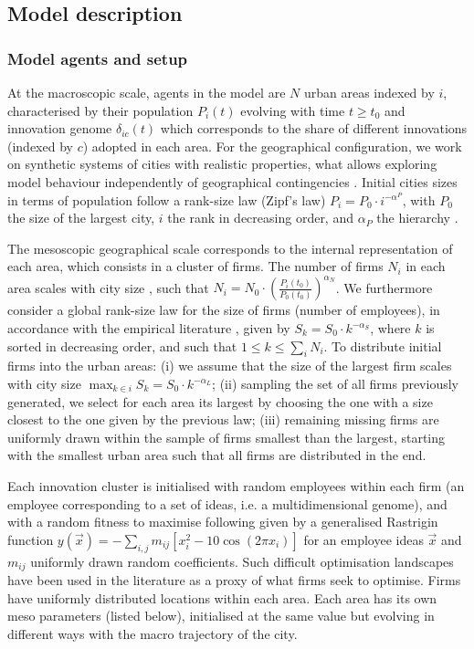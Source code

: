 \documentclass[letterpaper]{article}
\begin{document}
\subsection{Model description}

\subsubsection{Model agents and setup}

At the macroscopic scale, agents in the model are $N$ urban areas indexed by $i$, characterised by their population $P_i(t)$ evolving with time $t\geq t_0$ and innovation genome $\delta_{ic}(t)$ which corresponds to the share of different innovations (indexed by $c$) adopted in each area. For the geographical configuration, we work on synthetic systems of cities with realistic properties, what allows exploring model behaviour independently of geographical contingencies \citep{raimbault2019space}. Initial cities sizes in terms of population follow a rank-size law (Zipf's law) $P_i = P_0 \cdot i^{-\alpha^P}$, with $P_0$ the size of the largest city, $i$ the rank in decreasing order, and $\alpha_P$ the hierarchy \citep{ioannides2003zipf}.

The mesoscopic geographical scale corresponds to the internal representation of each area, which consists in a cluster of firms. The number of firms $N_i$ in each area scales with city size \citep{pumain2006evolutionary}, such that $N_i = N_0 \cdot \left(\frac{P_i (t_0)}{P_0 (t_0)}\right)^{\alpha_N}$. We furthermore consider a global rank-size law for the size of firms (number of employees), in accordance with the empirical literature \citep{axtell2001zipf}, given by $S_k = S_0 \cdot k^{- \alpha_S}$, where $k$ is sorted in decreasing order, and such that $1 \leq k \leq \sum_i N_i$. To distribute initial firms into the urban areas: (i) we assume that the size of the largest firm scales with city size $\max_{k\in i} S_k = S_0 \cdot k^{- \alpha_L}$; (ii) sampling the set of all firms previously generated, we select for each area its largest by choosing the one with a size closest to the one given by the previous law; (iii) remaining missing firms are uniformly drawn within the sample of firms smallest than the largest, starting with the smallest urban area such that all firms are distributed in the end.

Each innovation cluster is initialised with random employees within each firm (an employee corresponding to a set of ideas, i.e. a multidimensional genome), and with a random fitness to maximise following \cite{raimbault2022innovation} given by a generalised Rastrigin function $y(\vec{x}) = - \sum_{i,j} m_{ij} \left[x_i^2 - 10 \cos\left(2 \pi x_i\right) \right] $ for an employee ideas $\vec{x}$ and $m_{ij}$ uniformly drawn random coefficients. Such difficult optimisation landscapes have been used in the literature as a proxy of what firms seek to optimise. Firms have uniformly distributed locations within each area. Each area has its own meso parameters (listed below), initialised at the same value but evolving in different ways with the macro trajectory of the city.
\end{document}
